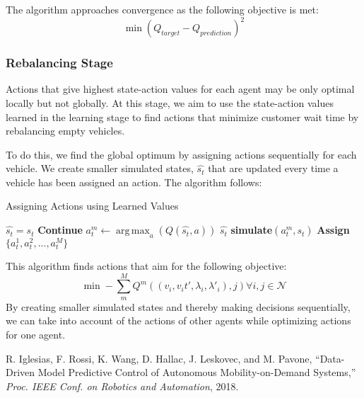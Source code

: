 \documentclass[letterpaper, 10 pt, conference]{ieeeconf}  %
\DeclareMathOperator*{\argmax}{arg\,max}
\begin{document}
The algorithm approaches convergence as the following objective is met:
\begin{equation}
        \min (Q_{target} - Q_{prediction})^2
\end{equation}


\subsubsection{Rebalancing Stage}
Actions that give highest state-action values for each agent may be only optimal locally but not globally. At this stage, we aim to use the state-action values learned in the learning stage to find actions that minimize customer wait time by rebalancing empty vehicles. 

To do this, we find the global optimum by assigning actions sequentially for each vehicle. We create smaller simulated states, $\hat{s_t}$ that are updated every time a vehicle has been assigned an action. The algorithm follows: 
\begin{algorithm}[H]
\caption{Assigning Actions using Learned Values}
\begin{algorithmic}
    \State $\hat{s_t}=s_t$
            \State \textbf{Continue}
        \EndIf
        \State $a_t^m \leftarrow \argmax_a(Q(\hat{s_t},a))$
        \State $\hat{s_t}$ \leftarrow \textbf{simulate}$(a^m_t,s_t)$
    \EndFor
    \State\textbf{Assign} $\{a^1_t,a^2_t,...,a^M_t\}$
\EndFor
\end{algorithmic}
\end{algorithm}

This algorithm finds actions that aim for the following objective: 
\begin{equation}
        \min -\sum_m^M Q^m((v_i,v_it',\lambda_i,\lambda'_i),j)\forall i,j\in \mathcal{N}
\end{equation}
By creating smaller simulated states and thereby making decisions sequentially, we can take into account of the actions of other agents while optimizing actions for one agent.  

\begin{thebibliography}{99}

 R. Iglesias, F. Rossi, K. Wang, D. Hallac, J. Leskovec, and M. Pavone, “Data-Driven Model Predictive Control of Autonomous Mobility-on-Demand Systems,” \textit{Proc. IEEE Conf. on Robotics and Automation}, 2018.


\end{thebibliography}
\end{document}
